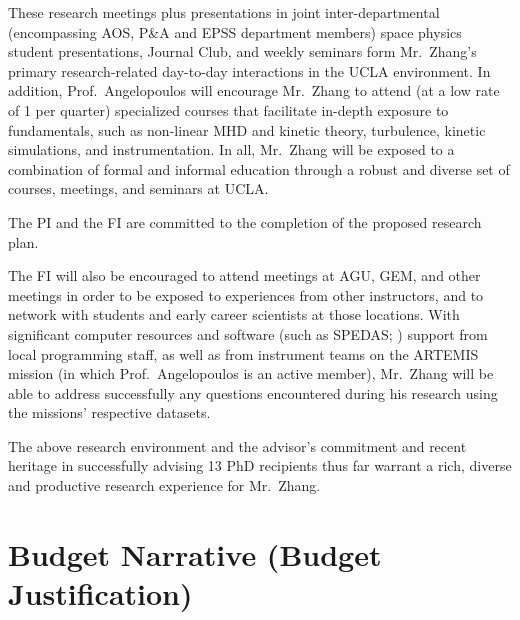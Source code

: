 \documentclass[
  letterpaper,
  DIV=11,
  numbers=noendperiod]{scrartcl}
\begin{document}
These research meetings plus presentations in joint inter-departmental
(encompassing AOS, P\&A and EPSS department members) space physics
student presentations, Journal Club, and weekly seminars form
Mr.~Zhang's primary research-related day-to-day interactions in the UCLA
environment. In addition, Prof.~Angelopoulos will encourage Mr.~Zhang to
attend (at a low rate of 1 per quarter) specialized courses that
facilitate in-depth exposure to fundamentals, such as non-linear MHD and
kinetic theory, turbulence, kinetic simulations, and instrumentation. In
all, Mr.~Zhang will be exposed to a combination of formal and informal
education through a robust and diverse set of courses, meetings, and
seminars at UCLA.

The PI and the FI are committed to the completion of the proposed
research plan.

The FI will also be encouraged to attend meetings at AGU, GEM, and other
meetings in order to be exposed to experiences from other instructors,
and to network with students and early career scientists at those
locations. With significant computer resources and software (such as
SPEDAS; \citep{Angelopoulos19}) support from local programming staff, as
well as from instrument teams on the ARTEMIS mission (in which
Prof.~Angelopoulos is an active member), Mr.~Zhang will be able to
address successfully any questions encountered during his research using
the missions' respective datasets.

The above research environment and the advisor's commitment and recent
heritage in successfully advising 13 PhD recipients thus far warrant a
rich, diverse and productive research experience for Mr.~Zhang.

\newpage{}

\section{Budget Narrative (Budget
Justification)}\label{budget-narrative-budget-justification}


\end{document}
